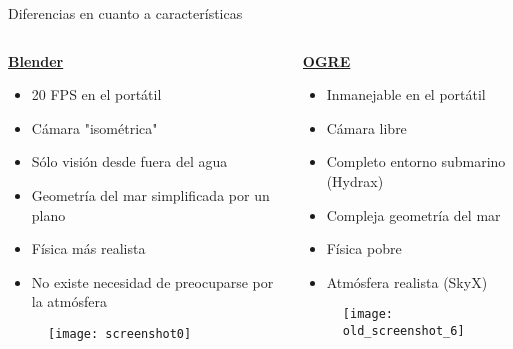 \begin{frame}{Diferencias en cuanto a características}
\begin{columns}
  \begin{column}{0.5\textwidth}
    \textbf{\underline{Blender}}
    \begin{itemize}
        \item 20 FPS en el portátil
        \item Cámara "isométrica"
        \item Sólo visión desde fuera del agua
        \item Geometría del mar simplificada por un plano
        \item Física más realista
        \item No existe necesidad de preocuparse por la atmósfera
    \end{itemize}
	\begin{figure}
		\texttt{[image: screenshot0]} 
	\end{figure}    
  \end{column}

  \begin{column}{0.5\textwidth}
    \textbf{\underline{OGRE}}
    \begin{itemize}
        \item Inmanejable en el portátil
        \item Cámara libre
        \item Completo entorno submarino (Hydrax)
        \item Compleja geometría del mar
        \item Física pobre
        \item Atmósfera realista (SkyX)
    \end{itemize}
	\begin{figure}
		\texttt{[image: old\_screenshot\_6]} 
	\end{figure}
  \end{column}
\end{columns}
\end{frame}
